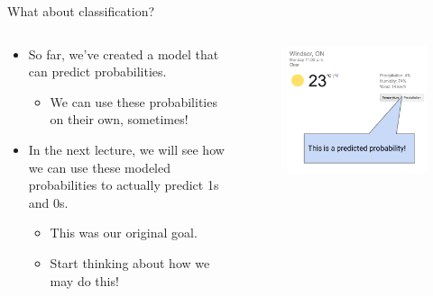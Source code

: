 \documentclass[aspectratio=169]{../latex_main/tntbeamer}  %
\begin{document}
	\begin{frame}{What about classification?}
	    \begin{columns}
	        \begin{column}{.5\textwidth}
	                \begin{itemize}
	                    \item So far, we’ve created a model that can predict probabilities.
	                    \begin{itemize}
	                        \item We can use these probabilities on their own, sometimes!
	                    \end{itemize}
	                    \item In the next lecture, we will see how we can use these modeled probabilities to actually predict 1s and 0s.
	                    \begin{itemize}
	                        \item This was our original goal.
	                        \item Start thinking about how we may do this!
	                    \end{itemize}
	                    
	                \end{itemize}
	        \end{column}
	        
	        \begin{column}{.5\textwidth}
	                \begin{figure}
	                    \centering
	                    \includegraphics[scale=.45]{Bild25}
	                \end{figure}
	        \end{column}
	    \end{columns}
	\end{frame}
	
\end{document}

